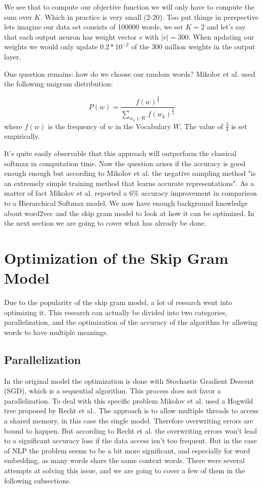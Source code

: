 We see that to compute our objective function we will only have to compute the sum over $K$. Which in practice is very small (2-20). Too put things in perspective lets imagine our data set consists of 100000 words, we set $K=2$ and let's say that each output neuron has weight vector $v$ with $|v| = 300$. When updating our weights we would only update  $0.2*10^{-2}$ of the 300 million weights in the output layer. 

One question remains: how do we choose our random words? Mikolov et al. \cite{mikolov2} used the following unigram distribution:
 
 \begin{equation}
P(w)=\frac{f(w)^{\frac{3}{4}}}{\sum_{w_k\in W} f(w_k)^{\frac{3}{4}}}
\end{equation}
where $f(w)$ is the frequency of $w$ in the Vocabulary $W$. The value of $\frac{3}{4}$ is set empirically.

It's quite easily observable that this approach will outperform the classical softmax in computation time. Now the question arises if the accuracy is good enough enough but according to Mikolov et al. \cite{mikolov2} the negative sampling method "is an extremely simple training method that learns accurate representations". As a matter of fact Mikolov et al. \cite{mikolov2} reported a 6\% accuracy improvement in comparison to a Hierarchical Softmax model.
We now have enough background knowledge about word2vec and the skip gram model to look at how it can be optimized. In the next section we are going to cover what has already be done.

\section{Optimization of the Skip Gram Model}
Due to the popularity of the skip gram model, a lot of research went into optimizing it. This research can actually be divided into two categories, parallelization, and the optimization of the accuracy of the algorithm by allowing words to have multiple meanings.

\subsection{Parallelization}
In the original model the optimization is done with Stochastic Gradient Descent (SGD), which is a sequential algorithm. This process does not favor a parallelization. To deal with this specific problem Mikolov et al.\cite{mikolov2} used a Hogwild tree proposed by Recht et al.\cite{hogwild}. The approach is to allow multiple threads to access a shared memory, in this case the single model. Therefore overwriting errors are bound to happen. But according to Recht et al.\cite{hogwild} the overwriting errors won't lead to a significant accuracy loss if the data access isn't too frequent. But in the case of NLP the problem seems to be a bit more significant, and especially for word embedding, as many words share the same context words. There were several attempts at solving this issue, and we are going to cover a few of them in the following subsections. 

